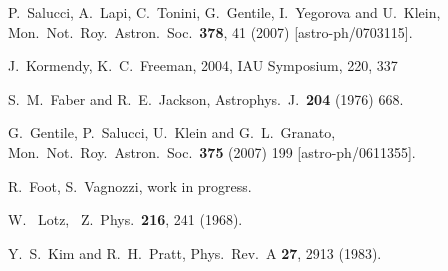 \documentclass[12pt]{article}
\begin{document}
{{\begin{thebibliography}{999}
P.~Salucci, A.~Lapi, C.~Tonini, G.~Gentile, I.~Yegorova and U.~Klein,
Mon.\ Not.\ Roy.\ Astron.\ Soc.\  {\bf 378}, 41 (2007) [astro-ph/0703115].

 J.~Kormendy, K.~C.~Freeman, 2004, IAU Symposium, 220, 337

  S.~M.~Faber and R.~E.~Jackson,
  Astrophys.\ J.\  {\bf 204} (1976) 668.
  
  G.~Gentile, P.~Salucci, U.~Klein and G.~L.~Granato,
  Mon.\ Not.\ Roy.\ Astron.\ Soc.\  {\bf 375} (2007) 199
  [astro-ph/0611355].
  
  
   R.~Foot, S.~Vagnozzi, work in progress.
   
W. ~Lotz, \ Z.\ Phys.\ {\bf 216}, 241 (1968).

Y.~S.~Kim and R.~H.~Pratt,
Phys.\ Rev.\ A {\bf 27}, 2913 (1983).
  
  
  
  

\end{thebibliography}}}
\end{document}
